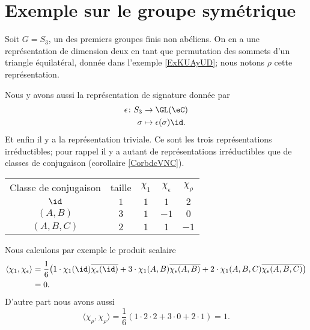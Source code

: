 \section{Exemple sur le groupe symétrique}

Soit \( G=S_3\), un des premiers groupes finis non abéliens. On en a une représentation de dimension deux en tant que permutation des sommets d'un triangle équilatéral, donnée dans l'exemple \ref{ExKUAyUD}; nous notons \( \rho\) cette représentation.

Nous y avons aussi la représentation de signature donnée par
\begin{equation}
    \begin{aligned}
        \epsilon\colon S_3&\to \GL(\eC) \\
        \sigma&\mapsto \epsilon(\sigma)\id. 
    \end{aligned}
\end{equation}
Et enfin il y a la représentation triviale. Ce sont les trois représentations irréductibles; pour rappel il y a autant de représentations irréductibles que de classes de conjugaison (corollaire \ref{CorbdcVNC}).

\begin{center}
    \begin{tabular}[]{ccccc}
        Classe de conjugaison   &   taille  &   \( \chi_1\) &   \( \chi_{\epsilon}\)    &   $\chi_{\rho}$\\
         $\id$   &   $1$    &   $1$    &   $1$    &   $2$    \\
         \( (A,B)\)   &   $3$    &   $1$    &   $-1$    &   $0$    \\
         \( (A,B,C)\)   &   \( 2\)    &   \( 1\)    &   \( 1\)    &   $-1$    \\
    \end{tabular}
\end{center}

Nous calculons par exemple le produit scalaire
\begin{subequations}
    \begin{align}
        \langle \chi_1, \chi_{\epsilon}\rangle &=\frac{1}{ 6 }\big( 1\cdot\chi_1(\id)\overline{ \chi_{\epsilon}(\id) }+3\cdot \chi_1(A,B)\overline{ \chi_{\epsilon}(A,B) }+2\cdot \chi_1(A,B,C)\overline{ \chi_{\epsilon}(A,B,C) } \big)\\
        &=0.
    \end{align}
\end{subequations}
D'autre part nous avons aussi
\begin{equation}
    \langle \chi_{\rho}, \chi_{\rho}\rangle =\frac{1}{ 6 }(1\cdot2\cdot 2+3\cdot 0+2\cdot 1)=1.
\end{equation}

